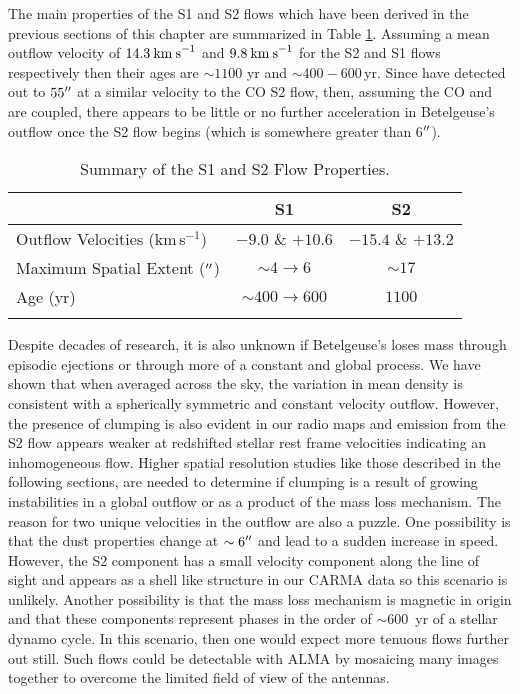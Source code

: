 The main properties of the S1 and S2 flows which have been derived in the previous sections of this chapter are summarized in Table \ref{tab:5.2}. Assuming a mean outflow velocity of $14.3\>{\rm km\>s}^{-1}$ and $9.8\>{\rm km\>s}^{-1}$ for the S2 and S1 flows respectively then their ages are $\sim 1100$ yr and $\sim 400 - 600$\,yr. Since \cite{plez_2002} have detected  out to $55^{\prime\prime}$ at a similar velocity to the CO S2 flow, then, assuming the CO and  are coupled, there appears to be little or no further acceleration in Betelgeuse's outflow once the S2 flow begins (which is somewhere greater than 6$^{\prime\prime}$). 

\begin{table}[!hbt]
\begin{center}
\caption[Summary of the S1 and S2 Flow Properties.]
{Summary of the S1 and S2 Flow Properties.}
\begin{tabular}{lcc}
\hline
\hline
\rule{0pt}{2.5ex} & S1 & S2 \\
\hline
Outflow Velocities (km\,s$^{-1}$) & $-9.0$ \& $+10.6$ & $-15.4$ \& $+13.2$ \\
Maximum Spatial Extent ($^{\prime\prime}$) & $\sim4 \rightarrow 6$ & $\sim 17$ \\
Age (yr) & $\sim 400 \rightarrow 600$ & $1100$ \\
\hline
\rule{0pt}{2.0ex}
\end{tabular}
\label{tab:5.2}
\end{center}
\end{table}

Despite decades of research, it is also unknown if Betelgeuse's loses mass through episodic ejections or through more of a constant and global process. We have shown that when averaged across the sky, the variation in mean density is consistent with a spherically symmetric and constant velocity outflow. However, the presence of clumping is also evident in our radio maps and emission from the S2 flow appears weaker at redshifted stellar rest frame velocities indicating an inhomogeneous flow. Higher spatial resolution studies like those described in the following sections, are needed to determine if clumping is a result of growing instabilities in a global outflow or as a product of the mass loss mechanism. The reason for two unique velocities in the outflow are also a puzzle. One possibility is that the dust properties change at $\sim 6^{\prime\prime}$ and lead to a sudden increase in speed. However, the S2 component has a small velocity component along the line of sight \citep{bernat_1979} and appears as a shell like structure in our CARMA data so this scenario is unlikely. Another possibility is that the mass loss mechanism is magnetic in origin and that these components represent phases in the order of $\sim 600$\, yr of a stellar dynamo cycle. In this scenario, then one would expect more tenuous flows further out still. Such flows could be detectable with ALMA by mosaicing many images together to overcome the limited field of view of the antennas.

